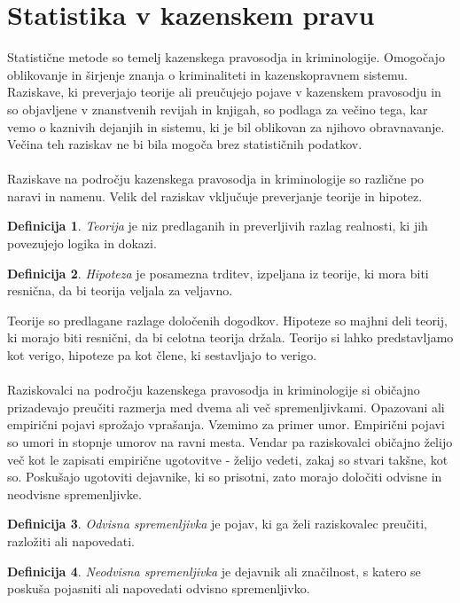 \documentclass[12pt,a4paper]{amsart}
\theoremstyle{definition} %
\newtheorem{definicija}{Definicija}[section]
\theoremstyle{plain} %
\begin{document}
\section{Statistika v kazenskem pravu}
Statistične metode so temelj kazenskega pravosodja in kriminologije. Omogočajo oblikovanje in širjenje znanja o kriminaliteti in kazenskopravnem 
sistemu. Raziskave, ki preverjajo teorije ali preučujejo pojave v kazenskem pravosodju in so objavljene v znanstvenih revijah in knjigah, so 
podlaga za večino tega, kar vemo o kaznivih dejanjih in sistemu, ki je bil oblikovan za njihovo obravnavanje. Večina teh raziskav ne bi bila mogoča 
brez statističnih podatkov.\\\\
Raziskave na področju kazenskega pravosodja in kriminologije so različne po naravi in namenu. Velik del raziskav vključuje preverjanje teorije in hipotez. 
\begin{definicija}
    \textit{Teorija} je niz predlaganih in preverljivih razlag realnosti, ki jih povezujejo logika in dokazi.
\end{definicija}
\begin{definicija}
    \textit{Hipoteza} je posamezna trditev, izpeljana iz teorije, ki mora biti resnična, da bi teorija veljala za veljavno.
\end{definicija}
Teorije so predlagane razlage določenih dogodkov. Hipoteze so majhni deli teorij, ki morajo biti resnični, da bi celotna teorija držala. Teorijo 
si lahko predstavljamo kot verigo, hipoteze pa kot člene, ki sestavljajo to verigo.\\\\
Raziskovalci na področju kazenskega pravosodja in kriminologije si običajno prizadevajo preučiti razmerja med dvema ali več spremenljivkami. Opazovani 
ali empirični pojavi sprožajo vprašanja. Vzemimo za primer umor. Empirični pojavi so umori in stopnje umorov 
na ravni mesta. Vendar pa raziskovalci običajno želijo več kot le zapisati empirične ugotovitve - želijo vedeti, zakaj so stvari takšne, kot so. Poskušajo 
ugotoviti dejavnike, ki so prisotni, zato morajo določiti odvisne in neodvisne spremenljivke.
\begin{definicija}
    \textit{Odvisna spremenljivka} je pojav, ki ga želi raziskovalec preučiti, razložiti ali napovedati.
\end{definicija}
\begin{definicija}
    \textit{Neodvisna spremenljivka} je dejavnik ali značilnost, s katero se poskuša pojasniti ali napovedati odvisno spremenljivko.
\end{definicija}
\end{document}
